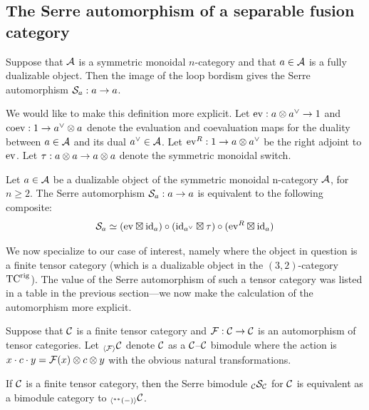 \documentclass{amsart}
\begin{document}
\subsection{The Serre automorphism of a separable fusion category}

Suppose that $\mathcal A$ is a symmetric monoidal $n$-category and that $a \in \mathcal A$ is a fully dualizable object.  Then the image of the loop bordism gives the Serre automorphism $\mathcal S_a: a \rightarrow a$.

We would like to make this definition more explicit.  Let $\mathrm{ev} : a \otimes a^{\vee} \rightarrow 1$ and $\mathrm{coev}: 1 \rightarrow a^{\vee} \otimes a$ denote the evaluation and coevaluation maps for the duality between $a \in \mathcal A$ and its dual $a^{\vee} \in \mathcal A$.  Let $\mathrm{ev}^R: 1 \rightarrow a \otimes a^{\vee}$ be the right adjoint to $\mathrm{ev}$.  Let $\tau: a \otimes a \rightarrow a \otimes a$ denote the symmetric monoidal switch.  

\begin{proposition}
Let $a \in \mathcal A$ be a dualizable object of the symmetric monoidal n-category $\mathcal A$, for $n \geq 2$.  The Serre automorphism $\mathcal S_a : a \rightarrow a$ is equivalent to the following composite:
\[
\mathcal S_a \simeq (\mathrm{ev} \boxtimes \mathrm{id}_a) \circ (\mathrm{id}_{a^{\vee}} \boxtimes \tau) \circ (\mathrm{ev}^R \boxtimes \mathrm{id}_a)
\] 
\end{proposition}

We now specialize to our case of interest, namely where the object in question is a finite tensor category (which is a dualizable object in the $(3,2)$-category ${\mathrm{TC}^{\text{rig}}}$).  The value of the Serre automorphism of such a tensor category was listed in a table in the previous section---we now make the calculation of the automorphism more explicit.


\begin{definition}
Suppose that $\mathcal C$ is a finite tensor category and $\mathcal F: \mathcal C \rightarrow \mathcal C$ is an automorphism of tensor categories.  Let ${}_{\langle\mathcal F\rangle} \mathcal C$ denote $\mathcal C$ as a $\mathcal C$--$\mathcal C$ bimodule where the action is $x \cdot c \cdot y = \mathcal F(x) \otimes c \otimes y$ with the obvious natural transformations.  
\end{definition}

\begin{theorem} \label{thm-serre}
If $\mathcal C$ is a finite tensor category, then the Serre bimodule ${}_{\mathcal C} {\mathcal S}_{\mathcal C}$ for $\mathcal C$ is equivalent as a bimodule category to ${}_{\langle{}^{**}{(-)}\rangle} \mathcal C$.
\end{theorem}
\end{document}
